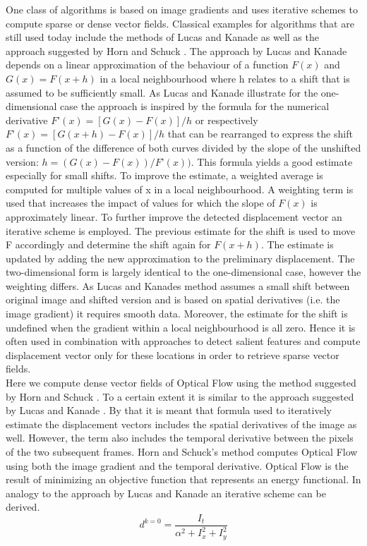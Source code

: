One class of algorithms is based on image gradients and uses iterative schemes to compute sparse or dense vector fields. Classical examples for algorithms that are still used today include the methods of Lucas and Kanade \parencite*{ lucas1981iterative} as well as  the approach suggested by Horn and Schuck \parencite*{ horn1981determining}. The approach by Lucas and Kanade \parencite*{ lucas1981iterative} depends on a linear approximation of the behaviour of a function $F(x)$ and $G(x) = F(x+h)$ in a local neighbourhood where h relates to a shift that is assumed to be sufficiently small. As Lucas and Kanade \parencite*{ lucas1981iterative}  illustrate for the one-dimensional case the approach is inspired by the formula for the numerical derivative $F’(x) = [G(x)-F(x)]/h$ or respectively $F’(x) = [G(x+h)-F(x)]/h$ that can be rearranged to express the shift as a function of the difference of both curves divided by the slope of the unshifted version: $h = (G(x)-F(x))/F’(x))$. This formula yields a good estimate especially for small shifts. To improve the estimate, a weighted average is computed for multiple values of x in a local neighbourhood. A weighting term is used that increases the impact of values for which the slope of $F(x)$ is approximately linear. To further improve the detected displacement vector an iterative scheme is employed. The previous estimate for the shift is used to move F accordingly and determine the shift again for $F(x+h)$. The estimate is updated by adding the new approximation to the preliminary displacement.  The two-dimensional form is largely identical to the one-dimensional case, however the weighting differs. As Lucas and Kanades \parencite*{ lucas1981iterative} method assumes a small shift between original image and shifted version and is based on spatial derivatives (i.e. the image gradient) it requires smooth data. Moreover, the estimate for the shift is undefined when the gradient within a local neighbourhood is all zero. Hence it is often used in combination with approaches to detect salient features and compute displacement vector only for these locations in order to retrieve sparse vector fields.\\
Here we compute dense vector fields of Optical Flow using the method suggested by Horn and Schuck \parencite*{horn1981determining}. To a certain extent it is similar to the approach suggested by Lucas and Kanade \parencite*{ lucas1981iterative}. By that it is meant that formula used to iteratively estimate the displacement vectors includes the spatial derivatives of the image as well.  However, the term also includes the temporal derivative between the pixels of the two subsequent frames. Horn and Schuck’s method computes Optical Flow using both the image gradient and the temporal derivative. Optical Flow is the result of minimizing an objective function that represents an energy functional. In analogy to the approach by Lucas and Kanade \parencite*{ lucas1981iterative} an iterative scheme can be derived. \\
\begin{equation}
  d^{k=0} = \frac{I_t}{\alpha^2+I_x^2+I_y^2}
\label{eqn:d_at_it_zero}
\end{equation}

